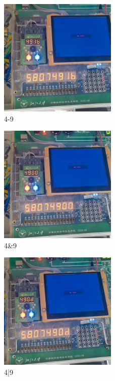 \documentclass{article}
\begin{document}
    \begin{figure}[H]
    \centering
    \includegraphics[width=0.5\textwidth]{lab8/17.jpg}
    \caption{\label{Lab8}4-9}
    \end{figure}

    \begin{figure}[H]
    \centering
    \includegraphics[width=0.5\textwidth]{lab8/18.jpg}
    \caption{\label{Lab8}4\&9}
    \end{figure}

    \begin{figure}[H]
    \centering
    \includegraphics[width=0.5\textwidth]{lab8/19.jpg}
    \caption{\label{Lab8}4|9}
    \end{figure}
\end{document}
